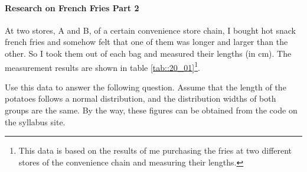 \documentclass{ltjsbook}
\begin{document}
\paragraph{Research on French Fries Part 2}
At two stores, A and B, of a certain convenience store chain, I bought hot snack french fries and somehow felt that one of them was longer and larger than the other. So I took them out of each bag and measured their lengths (in cm). The measurement results are shown in table \ref{tab::20_01}\footnote{This data is based on the results of me purchasing the fries at two different stores of the convenience chain and measuring their lengths.}.

Use this data to answer the following question. Assume that the length of the potatoes follows a normal distribution, and the distribution widths of both groups are the same. By the way, these figures can be obtained from the code on the syllabus site.

\end{document}

